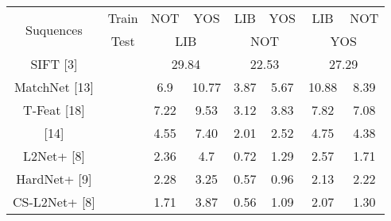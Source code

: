 \documentclass[letterpaper, 10 pt, conference]{ieeeconf}  %
\begin{document}
\begin{table}[h]
\begin{center}
\begin{tabular}{cccccccc}
\hline
\midrule
\multirow{2}{*}{Suquences} & \multicolumn{1}{c}{Train} & \multicolumn{1}{c}{NOT} & \multicolumn{1}{c}{YOS}  & \multicolumn{1}{c}{LIB}  & \multicolumn{1}{c}{YOS}  & \multicolumn{1}{c}{LIB}   & \multicolumn{1}{c}{NOT}  \\
  \cline{3-8}
                                            & \multicolumn{1}{c}{Test}                                     & \multicolumn{2}{c}{LIB}                                                   & \multicolumn{2}{c}{NOT}                                         & \multicolumn{2}{c}{YOS}                       \\
  \cline{1-8}
\multirow{1}{*}{SIFT [3]}     & \multicolumn{1}{c}{ }                                         & \multicolumn{2}{c}{29.84}                                                 & \multicolumn{2}{c}{22.53}                                         & \multicolumn{2}{c}{27.29}  \\
  \cline{3-8}
\multirow{1}{*}{MatchNet [13]}   & \multicolumn{1}{c}{ } & \multicolumn{1}{c}{6.9} & \multicolumn{1}{c}{10.77} & \multicolumn{1}{c}{3.87}  & \multicolumn{1}{c}{5.67}  & \multicolumn{1}{c}{10.88}  & \multicolumn{1}{c}{8.39}  \\
  \cline{3-8}
\multirow{1}{*}{T-Feat [18]} & \multicolumn{1}{c}{}  & \multicolumn{1}{c}{7.22} & \multicolumn{1}{c}{9.53} & \multicolumn{1}{c}{3.12}  & \multicolumn{1}{c}{3.83}  & \multicolumn{1}{c}{7.82}  & \multicolumn{1}{c}{7.08}  \\
  \cline{3-8}
\multirow{1}{*}{[14]}   & \multicolumn{1}{c}{}  & \multicolumn{1}{c}{4.55} & \multicolumn{1}{c}{7.40} & \multicolumn{1}{c}{2.01}  & \multicolumn{1}{c}{2.52}  & \multicolumn{1}{c}{4.75}  & \multicolumn{1}{c}{4.38}  \\
  \cline{3-8}
\multirow{1}{*}{L2Net+ [8]}   & \multicolumn{1}{c}{}  & \multicolumn{1}{c}{2.36} & \multicolumn{1}{c}{4.7} & \multicolumn{1}{c}{0.72}  & \multicolumn{1}{c}{1.29}  & \multicolumn{1}{c}{2.57}  & \multicolumn{1}{c}{1.71}  \\
  \cline{3-8}
\multirow{1}{*}{HardNet+ [9]}   & \multicolumn{1}{c}{}  & \multicolumn{1}{c}{2.28} & \multicolumn{1}{c}{3.25} & \multicolumn{1}{c}{0.57}  & \multicolumn{1}{c}{0.96}  & \multicolumn{1}{c}{2.13}  & \multicolumn{1}{c}{2.22}  \\
  \cline{3-8}
\multirow{1}{*}{CS-L2Net+ [8]}   & \multicolumn{1}{c}{}  & \multicolumn{1}{c}{1.71} & \multicolumn{1}{c}{3.87} & \multicolumn{1}{c}{0.56}  & \multicolumn{1}{c}{1.09}  & \multicolumn{1}{c}{2.07}  & \multicolumn{1}{c}{1.30}  \\

\end{tabular}
\end{center}
\end{table}
\end{document}

